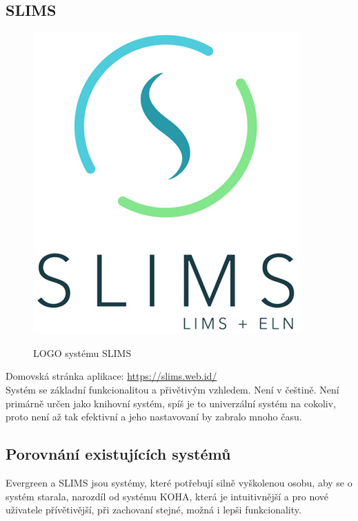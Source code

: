 \subsection{SLIMS}
\begin{figure}
	\includegraphics[width=\linewidth]{img/Slims_Logo.png}\\
	\caption[LOGO systému SLIMS ze stránky \url{https://slims.web.id/}]{LOGO systému SLIMS}
\end{figure}
Domovská stránka aplikace: \url{https://slims.web.id/}\\
Systém se základní funkcionalitou a přivětivým vzhledem.
Není v češtině. Není primárně určen jako knihovní systém, spíš je to univerzální
systém na cokoliv, proto není až tak efektivní a jeho nastavovaní
by zabralo mnoho času.

\subsection{Porovnání existujících systémů}
Evergreen a SLIMS jsou systémy, které potřebují silně vyškolenou osobu,
aby se o systém starala, narozdíl od systému KOHA, která je intuitivnější a
pro nové uživatele přívětivější, při zachovaní stejné, možná i lepši funkcionality.\\
